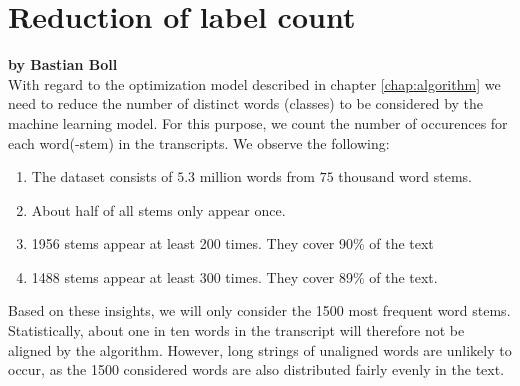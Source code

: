 
\section{Reduction of label count}
\label{sec:reduction_labels}

\textbf{by Bastian Boll} \\

With regard to the optimization model described in chapter \ref{chap:algorithm} we need to reduce the number of distinct words (classes) to be considered by the machine learning model. For this purpose, we count the number of occurences for each word(-stem) in the transcripts. We observe the following:
\begin{enumerate}
	\item The dataset consists of $5.3$ million words from $75$ thousand word stems.
	\item About half of all stems only appear once.
	\item 1956 stems appear at least 200 times. They cover 90\% of the text
	\item 1488 stems appear at least 300 times. They cover 89\% of the text.
\end{enumerate}
Based on these insights, we will only consider the 1500 most frequent word stems. Statistically, about one in ten words in the transcript will therefore not be aligned by the algorithm. However, long strings of unaligned words are unlikely to occur, as the 1500 considered words are also distributed fairly evenly in the text. 